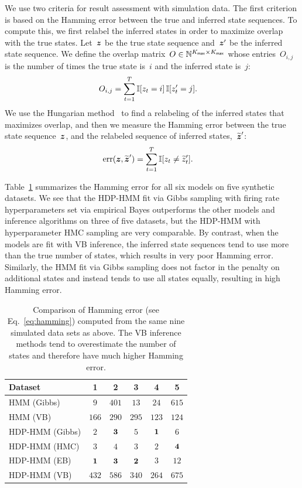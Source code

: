 We use two criteria for result assessment with simulation data.  The
first criterion is based on the Hamming error between the true and
inferred state sequences. To compute this, we first relabel the
inferred states in order to maximize overlap with the true
states. Let~$\boldsymbol{z}$ be the true state sequence
and~$\boldsymbol{z}'$ be the inferred state sequence. We define the
overlap matrix~$O \in \mathbb{N}^{K_{\mathsf{max}} \times K_{\mathsf{max}}}$ whose entries~$O_{i,j}$
is the number of times the true state is~$i$ and the inferred state
is~$j$:
\begin{align*}
O_{i,j} &= \sum_{t=1}^T \mathbb{I}[z_t=i] \, \mathbb{I}[z'_t=j].
\end{align*}
We use the Hungarian method~\citep{kuhn1955hungarian} to find a
relabeling of the inferred states that maximizes overlap, and then we
measure the Hamming error between the true state
sequence~$\boldsymbol{z}$, and the relabeled sequence of inferred
states,~$\widetilde{\boldsymbol{z}}'$:
\begin{align}
\label{eq:hamming}
\text{err}(\boldsymbol{z}, \widetilde{\boldsymbol{z}}') &= \sum_{t=1}^T \mathbb{I}[z_t \neq \widetilde{z}'_t].
\end{align}

Table~\ref{tab:synth_hamming} summarizes the Hamming error for all six
models on five synthetic datasets. We see that the HDP-HMM fit via
Gibbs sampling with firing rate hyperparameters set via empirical
Bayes outperforms the other models and inference algorithms on three
of five datasets, but the HDP-HMM with hyperparameter HMC sampling are
very comparable. By contrast, when the models are fit with VB
inference, the inferred state sequences tend to use more than the true
number of states, which results in very poor Hamming error. Similarly,
the HMM fit via Gibbs sampling does not factor in the penalty on
additional states and instead tends to use all states equally,
resulting in high Hamming error.

\begin{table}
  \centering
  \caption[Comparison of Hamming error on synthetic data]{Comparison
    of Hamming error (see Eq.~\ref{eq:hamming}) computed from the same
    nine simulated data sets as above. The VB inference methods tend
    to overestimate the number of states and therefore have much
    higher Hamming error.}
  \begin{tabular}{l|ccccc}
    Dataset & 1 & 2 & 3 & 4 & 5 \\
    \hline
    HMM (Gibbs)     & $9$ & $401$ & $13$ & $24$ & $615$ \\
    HMM (VB)        & $166$ & $290$ & $295$ & $123$ & $124$ \\
    HDP-HMM (Gibbs) & $2$ & $\bf{3}$ & $5$ & $\bf{1}$ & $6$ \\
    HDP-HMM (HMC)   & $3$ & $4$ & $3$ & $2$ & $\bf{4}$ \\
    HDP-HMM (EB)    & $\bf{1}$ & $\bf{3}$ & $\bf{2}$ & $3$ & $12$ \\ 
    HDP-HMM (VB)    & $432$ & $586$ & $340$ & $264$ & $675$ \\
    \hline
  \end{tabular}
  \label{tab:synth_hamming}
\end{table}

